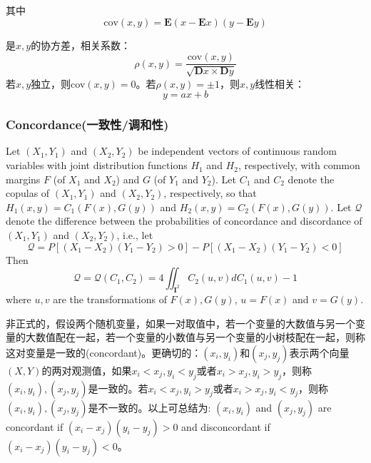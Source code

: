 其中
\begin{equation}
    \text{cov}(x,y) = \mathbf{E}(x-\mathbf{E}x) (y-\mathbf{E}y)
    \label{eq-covariation}
\end{equation}

是$x,y$的协方差，相关系数：
\begin{equation}
    \rho (x,y) = \dfrac{\text{cov}(x,y)}{\sqrt{\mathbf{D}x\times\mathbf{D}y}}
    \label{eq-coefficient}
\end{equation}
若$x,y$独立，则cov$(x,y) = 0$。若$\rho(x,y) = \pm 1$，则$x,y$线性相关：
\begin{equation*}
    y = ax+b
\end{equation*}


\subsubsection{Concordance(一致性/调和性)}
\begin{theorem}\cite{Bill2000An}
    Let $(X_1,Y_1)$ and $(X_2,Y_2)$ be independent vectors of continuous random variables with joint distribution functions $H_1$ and $H_2$, respectively, with common margins $F$ (of $X_1$ and $X_2$) and $G$ (of $Y_1$ and $Y_2$). Let $C_1$ and $C_2$ denote the copulas of $(X_1,Y_1)$ and $(X_2,Y_2)$, respectively, so that $H_1(x,y) = C_1(F(x), G(y))$ and $H_2(x,y) = C_2(F(x),G(y))$. Let $\mathcal{Q}$ denote the difference between the probabilities of concordance and discordance of $(X_1,Y_1)$ and $(X_2,Y_2)$, i.e., let
    \begin{equation}
        \mathcal{Q} = P [(X_1-X_2)(Y_1-Y_2) > 0] - P[(X_1-X_2)(Y_1-Y_2)<0]
        \label{eq-diff}
    \end{equation}
    Then
    \begin{equation}
        \mathcal{Q} = \mathcal{Q}(C_1,C_2) = 4 \iint_{\mathbf{I}^2}C_2(u,v)dC_1(u,v)-1
        \label{eq-diff2}
    \end{equation}
    where $u,v$ are the transformations of $F(x),G(y)$, $u=F(x)$ and $v = G(y)$.
    \label{th5.1.1}
\end{theorem}

非正式的，假设两个随机变量，如果一对取值中，若一个变量的大数值与另一个变量的大数值配在一起，若一个变量的小数值与另一个变量的小树枝配在一起，则称这对变量是一致的(concordant)。更确切的：$(x_i,y_i)$和$(x_j,y_j)$表示两个向量$(X,Y)$的两对观测值，如果$x_i<x_j,y_i<y_j$或者$x_i>x_j,y_i>y_j$，则称$(x_i,y_i),(x_j,y_j)$是一致的。若$x_i<x_j,y_i>y_j$或者$x_i>x_j,y_i<y_j$，则称$(x_i,y_i),(x_j,y_j)$是不一致的。以上可总结为:
$(x_i,y_i)$ and $(x_j,y_j)$ are concordant if $(x_i-x_j)(y_i-y_j)>0$ and disconcordant if $(x_i-x_j)(y_i-y_j)<0$。

